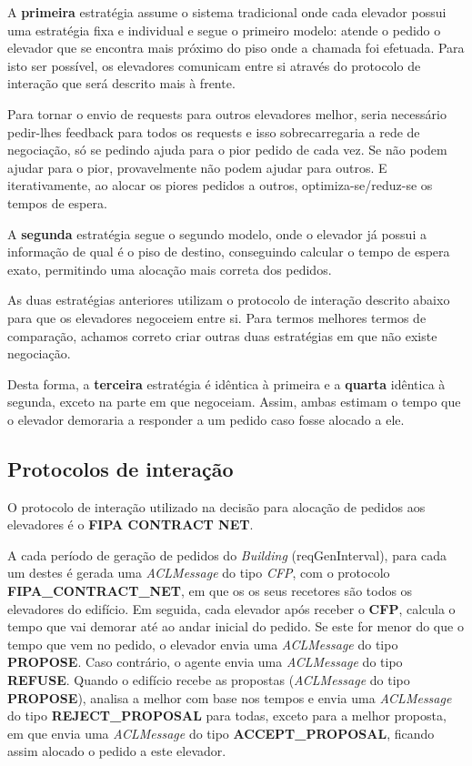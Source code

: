 ﻿\documentclass[a4paper]{article}
\begin{document}
A \textbf{primeira} estratégia assume o sistema tradicional onde cada elevador possui uma estratégia fixa e individual e segue o primeiro modelo: atende o pedido o elevador que se encontra mais próximo do piso onde a chamada foi efetuada. Para isto ser possível, os elevadores comunicam entre si através do protocolo de interação que será descrito mais à frente. 

Para tornar o envio de requests para outros elevadores melhor, seria necessário pedir-lhes feedback para todos os requests e isso sobrecarregaria a rede de negociação, só se pedindo ajuda para o pior pedido de cada vez. Se não podem ajudar para o pior, provavelmente não podem ajudar para outros. E iterativamente, ao alocar os piores pedidos a outros, optimiza-se/reduz-se os tempos de espera.

A \textbf{segunda} estratégia segue o segundo modelo, onde o elevador já possui a informação de qual é o piso de destino, conseguindo calcular o tempo de espera exato, permitindo uma alocação mais correta dos pedidos.

As duas estratégias anteriores utilizam o protocolo de interação descrito abaixo para que os elevadores negoceiem entre si. Para termos melhores termos de comparação, achamos correto criar outras duas estratégias em que não existe negociação.

Desta forma, a \textbf{terceira} estratégia é idêntica à primeira e a \textbf{quarta} idêntica à segunda, exceto na parte em que negoceiam. Assim, ambas estimam o tempo que o elevador demoraria a responder a um pedido caso fosse alocado a ele.

\subsection{Protocolos de interação} 

O protocolo de interação utilizado na decisão para alocação de pedidos aos elevadores é o \textbf{FIPA CONTRACT NET}.

A cada período de geração de pedidos do \textit{Building} (reqGenInterval), para cada um destes é gerada uma \textit{ACLMessage} do tipo \textit{CFP}, com o protocolo \textbf{FIPA\_CONTRACT\_NET}, em que os os seus recetores são todos os elevadores do edifício. Em seguida, cada elevador após receber o \textbf{CFP}, calcula o tempo que vai demorar até ao andar inicial do pedido. Se este for menor do que o tempo que vem no pedido, o elevador envia uma \textit{ACLMessage} do tipo \textbf{PROPOSE}. Caso contrário, o agente envia uma \textit{ACLMessage} do tipo \textbf{REFUSE}. Quando o edifício recebe as propostas (\textit{ACLMessage} do tipo \textbf{PROPOSE}), analisa a melhor com base nos tempos e envia uma \textit{ACLMessage} do tipo \textbf{REJECT\_PROPOSAL} para todas, exceto para a melhor proposta, em que envia uma \textit{ACLMessage} do tipo \textbf{ACCEPT\_PROPOSAL}, ficando assim alocado o pedido a este elevador.
\end{document}
